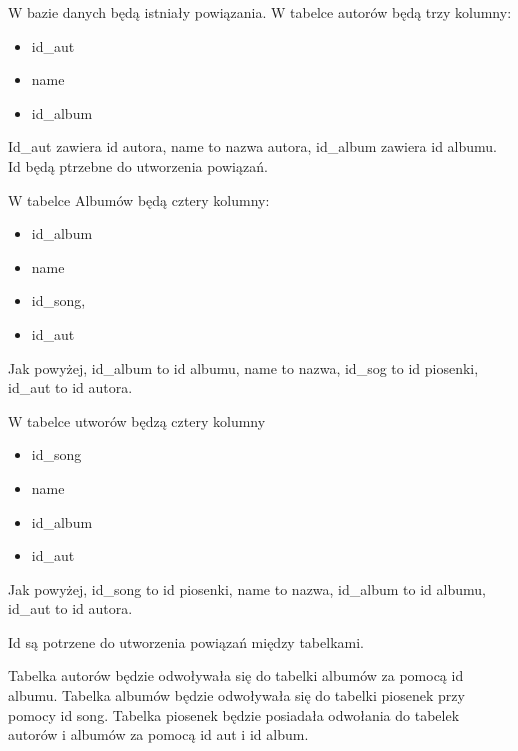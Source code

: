 W bazie danych będą istniały powiązania. W tabelce autorów będą trzy kolumny:
\begin{itemize}
	\item id\_aut
	\item name
	\item id\_album
\end{itemize}
Id\_aut zawiera id autora, name to nazwa autora, id\_album zawiera id albumu. Id będą ptrzebne do utworzenia powiązań.

W tabelce Albumów będą cztery kolumny:
\begin{itemize}
	\item id\_album
	\item name
	\item id\_song,
	\item id\_aut
\end{itemize}
Jak powyżej, id\_album to id albumu, name to nazwa, id\_sog to id piosenki, id\_aut to id autora.

W tabelce utworów będzą cztery kolumny
\begin{itemize}
	\item id\_song
	\item name
	\item id\_album
	\item id\_aut
\end{itemize}

Jak powyżej, id\_song to id piosenki, name to nazwa, id\_album to id albumu, id\_aut to id autora.

Id są potrzene do utworzenia powiązań między tabelkami.

Tabelka autorów będzie odwoływała się do tabelki albumów za pomocą id albumu. Tabelka albumów będzie odwoływała się do tabelki piosenek przy pomocy id song. Tabelka piosenek będzie posiadała odwołania do tabelek autorów i albumów za pomocą id aut i id album.
